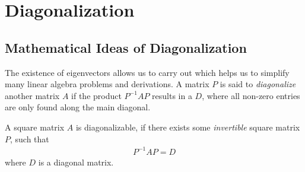 \section{Diagonalization}

\subsection{Mathematical Ideas of Diagonalization}
\label{section:diagonalizeidea}
The existence of eigenvectors allows us to carry out  which helps us to simplify many linear algebra problems and derivations. A matrix $P$ is said to \textit{diagonalize} another matrix $A$ if the product $P^{-1}AP$ results in a  $D$, where all non-zero entries are only found along the main diagonal.
\begin{defn}[Diagonalization]
A square matrix $A$ is diagonalizable, if there exists some \textit{invertible} square matrix $P$, such that
\begin{align}
P^{-1}AP = D
\end{align}
where $D$ is a diagonal matrix.
\end{defn}
